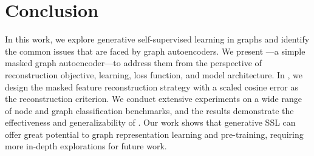 \section{Conclusion}%
\label{sec:conclusion}
In this work, we explore generative self-supervised learning in graphs and identify 
the common issues that are faced by graph autoencoders. 
We present \model---a simple masked graph autoencoder---to address them from the  perspective of reconstruction objective, learning, loss function, and model architecture.
In \model, we design the masked feature reconstruction strategy with a scaled cosine error as the reconstruction criterion.  
We conduct extensive experiments on a wide range of node and graph classification benchmarks, and the results demonstrate the  effectiveness and generalizability of \model. 
Our work shows that generative SSL can offer great potential to graph representation learning and pre-training, requiring  
more in-depth explorations for future work.





